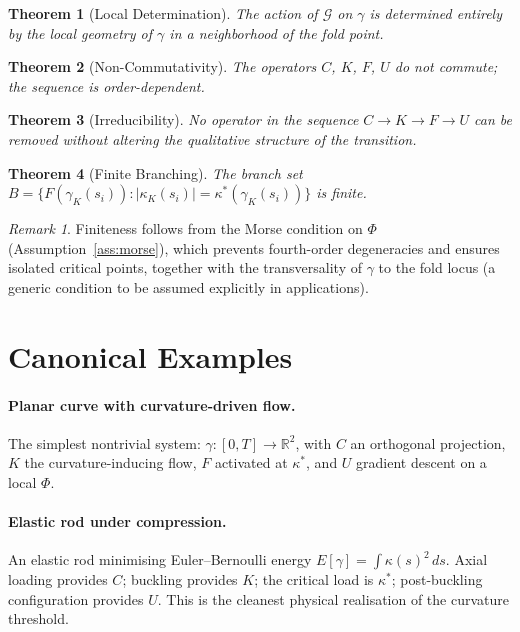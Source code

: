 \documentclass[12pt, oneside]{book}
\theoremstyle{plain}
\newtheorem{theorem}{Theorem}[section]
\theoremstyle{definition}
\theoremstyle{remark}
\newtheorem{remark}{Remark}[section]
\begin{document}
\begin{theorem}[Local Determination]
The action of $\mathcal{G}$ on $\gamma$ is determined entirely by the
local geometry of $\gamma$ in a neighborhood of the fold point.
\end{theorem}

\begin{theorem}[Non-Commutativity]
The operators $C$, $K$, $F$, $U$ do not commute; the sequence is
order-dependent.
\end{theorem}

\begin{theorem}[Irreducibility]
No operator in the sequence $C \to K \to F \to U$ can be removed
without altering the qualitative structure of the transition.
\end{theorem}

\begin{theorem}[Finite Branching]
The branch set $B = \{F(\gamma_K(s_i)) :
|\kappa_K(s_i)| = \kappa^*(\gamma_K(s_i))\}$ is finite.
\end{theorem}

\begin{remark}
Finiteness follows from the Morse condition on $\Phi$
(Assumption~\ref{ass:morse}), which prevents fourth-order degeneracies
and ensures isolated critical points, together with the transversality
of $\gamma$ to the fold locus (a generic condition to be assumed
explicitly in applications).
\end{remark}

\section{Canonical Examples}

\paragraph{Planar curve with curvature-driven flow.}
The simplest nontrivial system: $\gamma : [0,T] \to \mathbb{R}^2$,
with $C$ an orthogonal projection, $K$ the curvature-inducing flow,
$F$ activated at $\kappa^*$, and $U$ gradient descent on a local
$\Phi$.

\paragraph{Elastic rod under compression.}
An elastic rod minimising Euler--Bernoulli energy
$E[\gamma] = \int \kappa(s)^2\,ds$. Axial loading provides $C$;
buckling provides $K$; the critical load is $\kappa^*$; post-buckling
configuration provides $U$. This is the cleanest physical realisation
of the curvature threshold.
\end{document}
